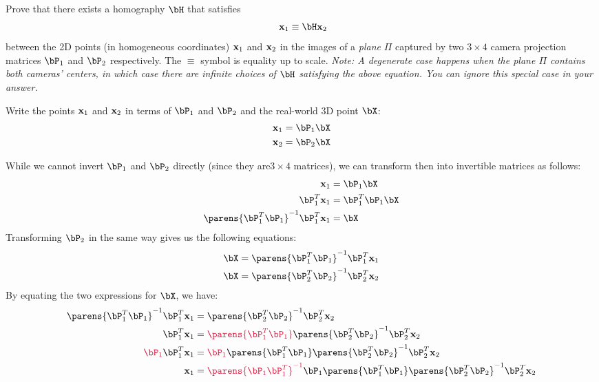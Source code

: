 \begin{problem}
  \begin{enumroman}
    \item Prove that there exists a homography $\bH$ that satisfies
      \begin{equation}~\label{eq:1}
        \bx_1 \equiv \bH \bx_2
      \end{equation}
      between the 2D points (in homogeneous coordinates) $\mathbf{x}_1$ and $\mathbf{x}_2$
      in the images of a \emph{plane} $\Pi$ captured by two $3 \times 4$ camera
      projection matrices $\bP_1$ and $\bP_2$ respectively.
      The $\equiv$ symbol is equality up to scale.
      \emph{
        Note: A degenerate case happens when the plane $\Pi$ contains both cameras'
        centers, in which case there are infinite choices of $\bH$
        satisfying the above equation.
        You can ignore this special case in your answer.
      }

      \begin{answer}
        Write the points $\mathbf{x}_1$ and $\mathbf{x}_2$ in terms of $\bP_1$ and $\bP_2$
        and the real-world 3D point $\bX$:
        \begin{align*}
          \bx_1 &= \bP_1 \bX \\
          \bx_2 &= \bP_2 \bX
        \end{align*}

        While we cannot invert $\bP_1$ and $\bP_2$ directly (since they are$3 \times 4$ matrices),
        we can transform then into invertible matrices as follows:
        \begin{align*}
          \bx_1 &= \bP_1 \bX \\
          \bP_1^T \bx_1 &= \bP_1^T \bP_1 \bX \\
          \parens{\bP_1^T \bP_1}^{-1} \bP_1^T \bx_1 &= \bX
        \end{align*}
        Transforming $\bP_2$ in the same way gives us the following equations:
        \begin{align*}
          \bX &= \parens{\bP_1^T \bP_1}^{-1} \bP_1^T \bx_1 \\
          \bX &= \parens{\bP_2^T \bP_2}^{-1} \bP_2^T \bx_2
        \end{align*}
        By equating the two expressions for $\bX$, we have:
        \begin{align*}
          \parens{\bP_1^T \bP_1}^{-1} \bP_1^T \bx_1 &= \parens{\bP_2^T \bP_2}^{-1} \bP_2^T \bx_2 \\
          \bP_1^{T} \bx_1 &= \crim{\parens{\bP_1^T \bP_1}} \parens{\bP_2^T \bP_2}^{-1} \bP_2^T \bx_2 \\
          \crim{\bP_1} \bP_1^{T} \bx_1 &= \crim{\bP_1} \parens{\bP_1^T \bP_1} \parens{\bP_2^T \bP_2}^{-1} \bP_2^T \bx_2 \\
          \bx_1 &= \crim{\parens{\bP_1 \bP_1^{T}}^{-1}} \bP_1 \parens{\bP_1^T \bP_1} \parens{\bP_2^T \bP_2}^{-1} \bP_2^T \bx_2 
        \end{align*}
        

\end{answer}
\end{enumroman}
\end{problem}
